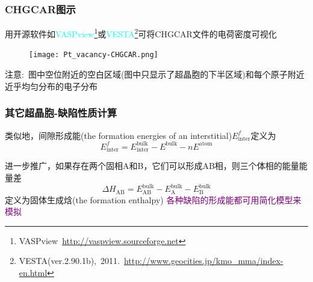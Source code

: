 \frame
{
	\frametitle{\textrm{CHGCAR}图示}
	用开源软件如\textcolor{cyan}{\textrm{VASPview}}\footnote{\textrm{VASPview~\url{http://vaspview.sourceforge.net}}}或\textcolor{cyan}{\textrm{VESTA}}\footnote{\textrm{VESTA(ver.2.90.1b),~2011.~\url{http://www.geocities.jp/kmo\_mma/index-en.html}}}可将\textrm{CHGCAR}文件的电荷密度可视化%
\begin{figure}[h!]
\centering
\texttt{[image: Pt\_vacancy-CHGCAR.png]}
\caption{\fontsize{6.2pt}{5.2pt}}%
\label{Pt_vacancy-Density}
\end{figure}

注意:~图中空位附近的空白区域(图中只显示了超晶胞的下半区域)和每个原子附近近乎均匀分布的电子分布
}

\frame
{
	\frametitle{其它超晶胞-缺陷性质计算}

类似地，间隙形成能\textrm{(the formation energies of an interstitial)}$E_{\mathrm{inter}}^f$定义为
\begin{displaymath}
	E_{\mathrm{inter}}^f=E_{\mathrm{inter}}^{\mathrm{bulk}}-E^{\mathrm{bulk}}-nE^{\mathrm{atom}}
\end{displaymath}
{\fontsize{6.2pt}{5.2pt}}

进一步推广，如果存在两个固相\textrm{A}和{B}，它们可以形成\textrm{AB}相，则三个体相的能量能量差
\begin{displaymath}
	\Delta H_{\mathrm{AB}}=E_{\mathrm{AB}}^{\mathrm{bulk}}-E_{\mathrm{A}}^{\mathrm{bulk}}-E_{\mathrm{B}}^{\mathrm{bulk}}
\end{displaymath}
定义为固体生成焓\textrm{(the formation enthalpy)}
\vskip 5pt
\textcolor{purple}{各种缺陷的形成能都可用简化模型来模拟}\\
{\fontsize{7.0pt}{5.2pt}\selectfont{用户在构造包含缺陷的超晶胞时，必须切记，超晶胞要设计得足够大，确保缺陷间的相互作用足够小}}
}

